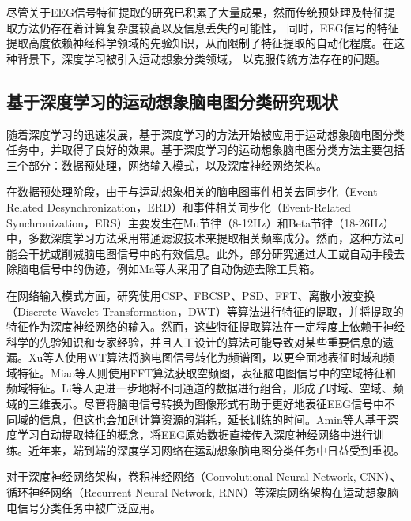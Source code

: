 尽管关于EEG信号特征提取的研究已积累了大量成果，然而传统预处理及特征提取方法仍存在着计算复杂度较高以及信息丢失的可能性，
同时，EEG信号的特征提取高度依赖神经科学领域的先验知识，从而限制了特征提取的自动化程度\cite{altaheri2023deep}。在这种背景下，深度学习被引入运动想象分类领域，
以克服传统方法存在的问题。

\subsection{基于深度学习的运动想象脑电图分类研究现状}

随着深度学习的迅速发展，基于深度学习的方法开始被应用于运动想象脑电图分类任务中，并取得了良好的效果。基于深度学习的运动想象脑电图分类方法主要包括三个部分：数据预处理，网络输入模式，以及深度神经网络架构。

在数据预处理阶段，由于与运动想象相关的脑电图事件相关去同步化（Event-Related Desynchronization，ERD）和事件相关同步化（Event-Related Synchronization，ERS）主要发生在Mu节律（8-12Hz）和Beta节律（18-26Hz）中\cite{altaheri2023deep}，多数深度学习方法采用带通滤波技术来提取相关频率成分。然而，这种方法可能会干扰或削减脑电图信号中的有效信息。此外，部分研究通过人工或自动手段去除脑电信号中的伪迹，例如Ma等人\cite{ma2019deep}采用了自动伪迹去除工具箱\cite{gomez2006automatic}。

在网络输入模式方面，研究\cite{luo2018exploring,olivas2019classification,she2019hierarchical,ma2020dwt,chu2018decoding,hassanpour2019novel}使用CSP、FBCSP、PSD、FFT、离散小波变换（Discrete Wavelet Transformation，DWT）等算法进行特征的提取，并将提取的特征作为深度神经网络的输入。然而，这些特征提取算法在一定程度上依赖于神经科学的先验知识和专家经验，并且人工设计的算法可能导致对某些重要信息的遗漏。Xu等人\cite{xu2018wavelet}使用WT算法将脑电图信号转化为频谱图，以更全面地表征时域和频域特征。Miao等人\cite{miao2020spatial}则使用FFT算法获取空频图，表征脑电图信号中的空域特征和频域特征。Li等人\cite{li2020novel}更进一步地将不同通道的数据进行组合，形成了时域、空域、频域的三维表示。尽管将脑电信号转换为图像形式有助于更好地表征EEG信号中不同域的信息，但这也会加剧计算资源的消耗，延长训练的时间。Amin\cite{amin2019deep}等人基于深度学习自动提取特征的概念，将EEG原始数据直接传入深度神经网络中进行训练。近年来，端到端的深度学习网络在运动想象脑电图分类任务中日益受到重视。

对于深度神经网络架构，卷积神经网络（Convolutional Neural Network, CNN）、循环神经网络（Recurrent Neural Network, RNN）等深度网络架构在运动想象脑电信号分类任务中被广泛应用。

